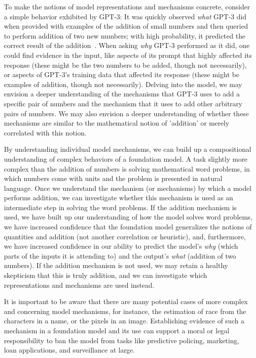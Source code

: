 To make the notions of model representations and mechanisms concrete, consider a simple behavior exhibited by GPT-3: 
It was quickly observed \textit{what} GPT-3 did when provided with examples of the addition of small numbers and then queried to perform addition of two new numbers; with high probability, it predicted the correct result of the addition~\citep{branwen2020gpt,brockman2020math}.
When asking \textit{why} GPT-3 performed as it did, one could find evidence in the input, like aspects of its prompt that highly affected its response (these might be the two numbers to be added, though not necessarily), or aspects of GPT-3’s training data that affected its response (these might be examples of addition, though not necessarily).
Delving into the model, we may envision a deeper understanding of the mechanisms that GPT-3 uses to add a specific pair of numbers and the mechanism that it uses to add other arbitrary pairs of numbers.
We may also envision a deeper understanding of whether these mechanisms are similar to the mathematical notion of 'addition' or merely correlated with this notion.

By understanding individual model mechanisms, we can build up a compositional understanding of complex behaviors of a foundation model.
A task slightly more complex than the addition of numbers is solving mathematical word problems, in which numbers come with units and the problem is presented in natural language. 
Once we understand the mechanism (or mechanisms) by which a model performs addition, we can investigate whether this mechanism is used as an intermediate step in solving the word problems.
If the addition mechanism is used, we have built up our understanding of how the model solves word problems, we have increased confidence that the foundation model generalizes the notions of quantities and addition (not another correlation or heuristic), and, furthermore, we have increased confidence in our ability to predict the model's \textit{why} (which parts of the inputs it is attending to) and the output's \textit{what} (addition of two numbers).
If the addition mechanism is not used, we may retain a healthy skepticism that this is truly addition, and we can investigate which representations and mechanisms are used instead.

It is important to be aware that there are many potential cases of more complex and concerning model mechanisms, for instance, the estimation of race from the characters in a name, or the pixels in an image.
Establishing evidence of such a mechanism in a foundation model and its use can support a moral or legal responsibility to ban the model from tasks like predictive policing, marketing, loan applications, and surveillance at large.

